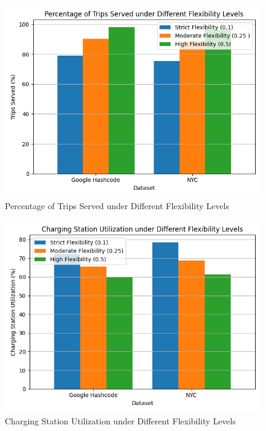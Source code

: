 \begin{figure}[h]
\centering
\includegraphics[scale=0.55]{Crest/Images/trips_served_flexibility.png}
\caption{Percentage of Trips Served under Different Flexibility Levels}
\label{fig:trips_served_flexibility}
\end{figure}

\begin{figure}[h]
\centering
\includegraphics[scale=0.55]{Crest/Images/charging_utilization_flexibility.png}
\caption{Charging Station Utilization under Different Flexibility Levels}
\label{fig:charging_utilization_flexibility}
\end{figure}

